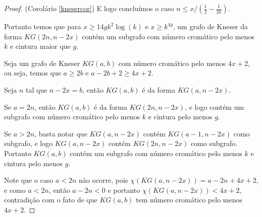 \begin{proof}{(Corolário \ref{knesercor})}
E logo concluímos o caso $n \leq x/(\frac{1}{2} - \frac{1}{2k})$.

Portanto temos que para $x \geq 14gk^2\log(k)$ e $x\geq k^{4g}$, um grafo de Kneser da forma $KG(2n,n-2x)$ contém um subgrafo com número cromático pelo menos $k$ e cintura maior que $g$.

Seja um grafo de Kneser $KG(a,b)$ com número cromático pelo menos $4x+2$, ou seja, temos que $a \geq 2b$ e $a-2b+2 \geq 4x+2$.

Seja $n$ tal que $n-2x = b$, então $KG(a,b)$ é da forma $KG(a,n-2x)$.

Se $a = 2n$, então $KG(a,b)$ é da forma $KG(2n, n-2x)$, e logo contém um subgrafo com número cromático pelo menos $k$ e cintura pelo menos $g$.

Se $a > 2n$, basta notar que $KG(a,n-2x)$ contém $KG(a-1,n-2x)$ como subgrafo, e logo $KG(a,n-2x)$ contém $KG(2n,n-2x)$ como subgrafo. Portanto $KG(a,b)$ contém um subgrafo com número cromático pelo menos $k$ e cintura pelo menos $g$.

Note que o caso $a<2n$ não ocorre, pois $\chi(KG(a,n-2x)) = a - 2n + 4x + 2$, e como $a < 2n$, então $a - 2n < 0$ e portanto $\chi(KG(a,n-2x)) < 4x+2$, contradição com o fato de que $KG(a,b)$ tem número cromático pelo menos $4x+2$.
\end{proof}


